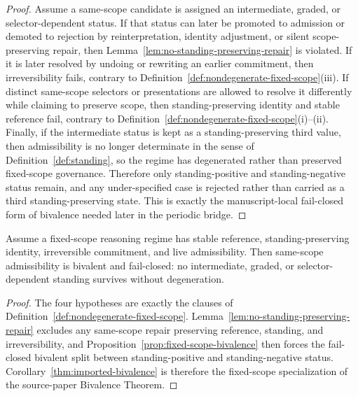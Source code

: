 \begin{proof}
Assume a same-scope candidate is assigned an intermediate, graded, or selector-dependent status. If that status can later be promoted to admission or demoted to rejection by reinterpretation, identity adjustment, or silent scope-preserving repair, then Lemma~\ref{lem:no-standing-preserving-repair} is violated. If it is later resolved by undoing or rewriting an earlier commitment, then irreversibility fails, contrary to Definition~\ref{def:nondegenerate-fixed-scope}(iii). If distinct same-scope selectors or presentations are allowed to resolve it differently while claiming to preserve scope, then standing-preserving identity and stable reference fail, contrary to Definition~\ref{def:nondegenerate-fixed-scope}(i)--(ii). Finally, if the intermediate status is kept as a standing-preserving third value, then admissibility is no longer determinate in the sense of Definition~\ref{def:standing}, so the regime has degenerated rather than preserved fixed-scope governance. Therefore only standing-positive and standing-negative status remain, and any under-specified case is rejected rather than carried as a third standing-preserving state. This is exactly the manuscript-local fail-closed form of bivalence needed later in the periodic bridge.
\end{proof}

\begin{manualcorollary}
\label{thm:imported-bivalence}
Assume a fixed-scope reasoning regime has stable reference, standing-preserving identity, irreversible commitment, and live admissibility. Then same-scope admissibility is bivalent and fail-closed: no intermediate, graded, or selector-dependent standing survives without degeneration.
\end{manualcorollary}

\begin{proof}
The four hypotheses are exactly the clauses of Definition~\ref{def:nondegenerate-fixed-scope}. Lemma~\ref{lem:no-standing-preserving-repair} excludes any same-scope repair preserving reference, standing, and irreversibility, and Proposition~\ref{prop:fixed-scope-bivalence} then forces the fail-closed bivalent split between standing-positive and standing-negative status. Corollary~\ref{thm:imported-bivalence} is therefore the fixed-scope specialization of the source-paper Bivalence Theorem.
\end{proof}

